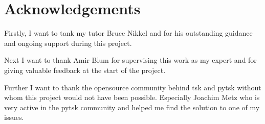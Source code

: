 \chapter*{Acknowledgements}
\label{chap:acknowledgements}

Firstly, I want to tank my tutor Bruce Nikkel and for his outstanding guidance and ongoing support during this project.

Next I want to thank Amir Blum for supervising this work as my expert and for giving valuable feedback at the start of the project.

Further I want to thank the \gls{opensource} community behind \gls{tsk} and \gls{pytsk} without whom this project would not have been possible. Especially Joachim Metz who is very active in the \gls{pytsk} community and helped me find the solution to one of my issues.
